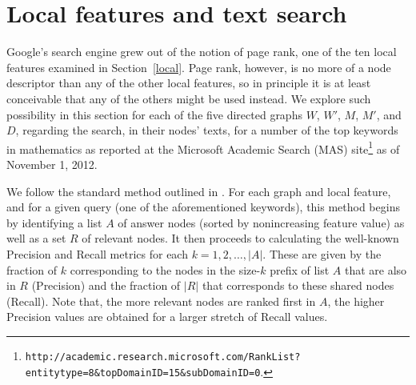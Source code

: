 \documentclass{article}
\begin{document}
\section{Local features and text search}\label{local-search}

Google's search engine grew out of the notion of page rank, one of the ten local
features examined in Section~\ref{local}. Page rank, however, is no more of a
node descriptor than any of the other local features, so in principle it is at
least conceivable that any of the others might be used instead. We explore such
possibility in this section for each of the five directed graphs $W$, $W'$, $M$,
$M'$, and $D$, regarding the search, in their nodes' texts, for a number of the
top keywords in mathematics as reported at the Microsoft Academic Search (MAS)
site\footnote{\texttt{http://academic.research.microsoft.com/RankList?entitytype=8\&topDomainID=15\&\linebreak subDomainID=0}.} as of November 1, 2012.

We follow the standard method outlined in \cite{br11}. For each graph and local
feature, and for a given query (one of the aforementioned keywords), this method
begins by identifying a list $A$ of answer nodes (sorted by nonincreasing
feature value) as well as a set $R$ of relevant nodes. It then proceeds to
calculating the well-known Precision and Recall metrics for each
$k=1,2,\ldots,\vert A\vert$. These are given by the fraction of $k$
corresponding to the nodes in the size-$k$ prefix of list $A$ that are also in
$R$ (Precision) and the fraction of $\vert R\vert$ that corresponds to these
shared nodes (Recall). Note that, the more relevant nodes are ranked first in
$A$, the higher Precision values are obtained for a larger stretch of Recall
values.
\end{document}
